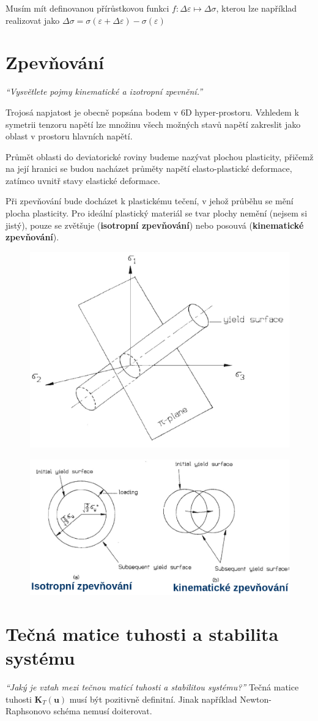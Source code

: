 \documentclass{article}
\begin{document}
	Musím mít definovanou přírůstkovou funkci $f : \Delta\varepsilon \mapsto \Delta\sigma$, kterou lze například realizovat jako $\Delta\sigma = \sigma(\varepsilon+\Delta\varepsilon) - \sigma(\varepsilon)$

	\section{Zpevňování}
	\emph{``Vysvětlete pojmy kinematické a izotropní zpevnění.''}

	Trojosá napjatost je obecně popsána bodem v 6D hyper-prostoru. Vzhledem k symetrii tenzoru napětí lze množinu všech možných stavů napětí zakreslit jako oblast v prostoru hlavních napětí.

	Průmět oblasti do deviatorické roviny budeme nazývat plochou plasticity, přičemž na její hranici se budou nacházet průměty napětí elasto-plastické deformace, zatímco uvnitř stavy elastické deformace.

	Při zpevňování bude docházet k plastickému tečení, v jehož průběhu se mění plocha plasticity. Pro ideální plastický materiál se tvar plochy nemění (nejsem si jistý), pouze se zvětšuje (\textbf{isotropní zpevňování}) nebo posouvá (\textbf{kinematické zpevňování}).
	\begin{figure}[h!]
		\centering
		\includegraphics[width=.5\linewidth]{figs/PlochaPlasticity.png}
	\end{figure}
	\begin{figure}[h!]
		\centering
		\includegraphics[width=.5\linewidth]{figs/Zpevnovani.png}
	\end{figure}

	\section{Tečná matice tuhosti a stabilita systému}
	\emph{``Jaký je vztah mezi tečnou maticí tuhosti a stabilitou systému?''}
	Tečná matice tuhosti $\bm{K}_T(\bm{u})$ musí být pozitivně definitní. Jinak například Newton-Raphsonovo schéma nemusí doiterovat.
\end{document}
